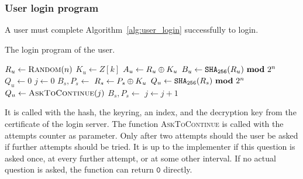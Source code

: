 \subsubsection{User login program}
A user must complete Algorithm~\vref{alg:user_login} successfully to login.
\begin{algorithm}
\caption{The login program of the user.}
\label{alg:user_login}
\begin{algorithmic}[1]
\State $R_u\gets\Call{Random}{n}$
\State $K_u\gets Z[k]$
\State $A_u\gets R_u\oplus K_u$
\State $B_u\gets\texttt{\ensuremath{\mathtt{SHA_{256}}}}(R_u)\ \textbf{mod}\ 2^{n}$
\State $Q_u\gets 0$
\State $j\gets 0$
\State $B_s,P_s\gets$
	
\State $R_s\gets P_s\oplus K_u$
\State $Q_u\gets\texttt{\ensuremath{\mathtt{SHA_{256}}}}(R_s)\ \textbf{mod}\ 2^{n}$
\Else
\State $Q_u\gets\Call{AskToContinue}{j}$
\EndIf
\State $B_s,P_s\gets$
\State $j\gets j+1$
\EndWhile
{} 
 
 
\State{} 
\EndIf
\EndIf
\EndIf
\EndProcedure
\end{algorithmic}
\end{algorithm}
It is called with the hash, the keyring, an index, and the decryption key from the certificate of the login server.
The function \textsc{AskToContinue} is called with the attempts counter as parameter.
Only after two attempts should the user be asked if further attempts should be tried.
It is up to the implementer if this question is asked once,
at every further attempt,
or at some other interval.
If no actual question is asked,
the function can return $\mathtt{0}$ directly.
